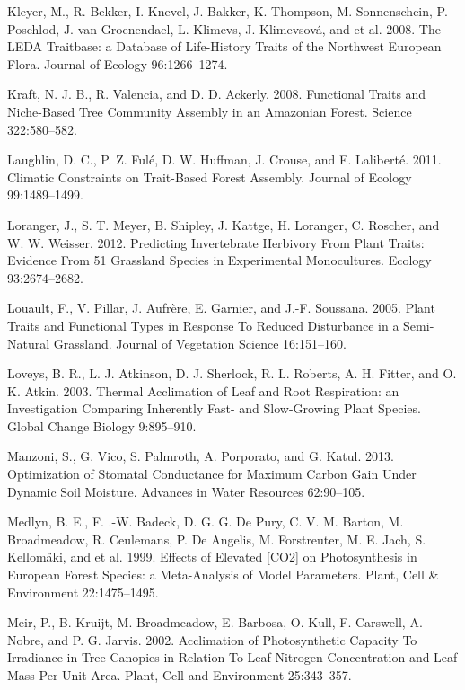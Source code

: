 \documentclass[11pt]{article}
\begin{document}
\begin{hangparas}{1.5em}{1}
\hypertarget{citeproc_bib_item_63}{Kleyer, M., R. Bekker, I. Knevel, J. Bakker, K. Thompson, M. Sonnenschein, P. Poschlod, J. van Groenendael, L. Klimevs, J. Klimevsová, and et al. 2008. The LEDA Traitbase: a Database of Life-History Traits of the Northwest European Flora. Journal of Ecology 96:1266–1274.}

\hypertarget{citeproc_bib_item_64}{Kraft, N. J. B., R. Valencia, and D. D. Ackerly. 2008. Functional Traits and Niche-Based Tree Community Assembly in an Amazonian Forest. Science 322:580–582.}

\hypertarget{citeproc_bib_item_65}{Laughlin, D. C., P. Z. Fulé, D. W. Huffman, J. Crouse, and E. Laliberté. 2011. Climatic Constraints on Trait-Based Forest Assembly. Journal of Ecology 99:1489–1499.}

\hypertarget{citeproc_bib_item_66}{Loranger, J., S. T. Meyer, B. Shipley, J. Kattge, H. Loranger, C. Roscher, and W. W. Weisser. 2012. Predicting Invertebrate Herbivory From Plant Traits: Evidence From 51 Grassland Species in Experimental Monocultures. Ecology 93:2674–2682.}

\hypertarget{citeproc_bib_item_67}{Louault, F., V. Pillar, J. Aufrère, E. Garnier, and J.-F. Soussana. 2005. Plant Traits and Functional Types in Response To Reduced Disturbance in a Semi-Natural Grassland. Journal of Vegetation Science 16:151–160.}

\hypertarget{citeproc_bib_item_68}{Loveys, B. R., L. J. Atkinson, D. J. Sherlock, R. L. Roberts, A. H. Fitter, and O. K. Atkin. 2003. Thermal Acclimation of Leaf and Root Respiration: an Investigation Comparing Inherently Fast- and Slow-Growing Plant Species. Global Change Biology 9:895–910.}

\hypertarget{citeproc_bib_item_69}{Manzoni, S., G. Vico, S. Palmroth, A. Porporato, and G. Katul. 2013. Optimization of Stomatal Conductance for Maximum Carbon Gain Under Dynamic Soil Moisture. Advances in Water Resources 62:90–105.}

\hypertarget{citeproc_bib_item_70}{Medlyn, B. E., F. .-W. Badeck, D. G. G. De Pury, C. V. M. Barton, M. Broadmeadow, R. Ceulemans, P. De Angelis, M. Forstreuter, M. E. Jach, S. Kellomäki, and et al. 1999. Effects of Elevated [CO2] on Photosynthesis in European Forest Species: a Meta-Analysis of Model Parameters. Plant, Cell \& Environment 22:1475–1495.}

\hypertarget{citeproc_bib_item_71}{Meir, P., B. Kruijt, M. Broadmeadow, E. Barbosa, O. Kull, F. Carswell, A. Nobre, and P. G. Jarvis. 2002. Acclimation of Photosynthetic Capacity To Irradiance in Tree Canopies in Relation To Leaf Nitrogen Concentration and Leaf Mass Per Unit Area. Plant, Cell and Environment 25:343–357.}


\end{hangparas}
\end{document}
